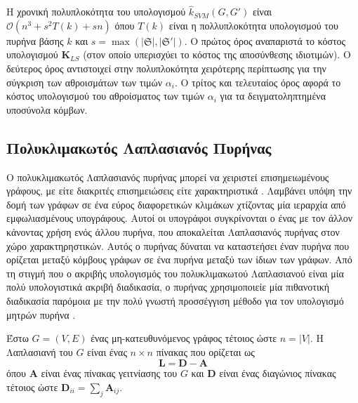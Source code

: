 Η χρονική πολυπλοκότητα του υπολογισμού $\hat{k}_{SVM}(G, G')$ είναι $\mathcal{O}(n^3 + s^2 T(k) + sn)$ όπου $T(k)$ είναι η πολλυπλοκότητα υπολογισμού του πυρήνα βάσης $k$ και $s = \max(|\mathfrak{S}|, |\mathfrak{S}'|)$.
Ο πρώτος όρος αναπαριστά το κόστος υπολογισμού $\mathbf{K}_{LS}$ (στον οποίο υπερισχύει το κόστος της αποσύνθεσης ιδιοτιμών).
Ο δεύτερος όρος αντιστοιχεί στην πολυπλοκότητα χειρότερης περίπτωσης για την σύγκριση των αθροισμάτων των τιμών $\alpha_i$.
Ο τρίτος και τελευταίος όρος αφορά το κόστος υπολογισμού του αθροίσματος των τιμών $\alpha_i$ για τα δειγματοληπτημένα υποσύνολα κόμβων.

\subsection{Πολυκλιμακωτός Λαπλασιανός Πυρήνας}

Ο πολυκλιμακωτός Λαπλασιανός πυρήνας μπορεί να χειριστεί επισημειωμένους γράφους, με είτε διακριτές επισημειώσεις είτε χαρακτηριστικά \cite{kondor2016multiscale}.
Λαμβάνει υπόψη την δομή των γράφων σε ένα εύρος διαφορετικών κλιμάκων χτίζοντας μία ιεραρχία από εμφωλιασμένους υπογράφους.
Αυτοί οι υπογράφοι συγκρίνονται ο ένας με τον άλλον κάνοντας χρήση ενός άλλου πυρήνα, που αποκαλείται Λαπλασιανός πυρήνας στον χώρο χαρακτηρηστικών.
Αυτός ο πυρήνας δύναται να καταστεήσει έναν πυρήνα που ορίζεται μεταξύ κόμβους γράφων σε ένα πυρήνα μεταξύ των ίδιων των γράφων.
Από τη στιγμή που ο ακριβής υπολογισμός του πολυκλιμακωτού Λαπλασιανού είναι μία πολύ υπολογιστικά ακριβή διαδικασία, ο πυρήνας χρησιμοποιείε μία πιθανοτική διαδικασία παρόμοια με την πολύ γνωστή προσσέγγιση μέθοδο  για τον υπολογισμό μητρών πυρήνα \cite{williams2001using}.

Έστω $G=(V,E)$ ένας μη-κατευθυνόμενος γράφος τέτοιος ώστε $n = |V|$.
Η Λαπλασιανή του $G$ είναι ένας $n \times n$ πίνακας που ορίζεται ως
\begin{equation*}
    \mathbf{L} = \mathbf{D} - \mathbf{A} 
\end{equation*}
όπου $\mathbf{A}$ είναι ένας πίνακας γειτνίασης του $G$ και $\mathbf{D}$ είναι ένας διαγώνιος πίνακας τέτοιος ώστε $\mathbf{D}_{ii} = \sum_j \mathbf{A}_{ij}$.

